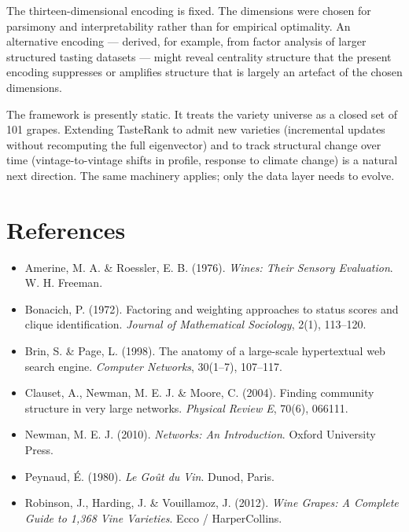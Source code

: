 \documentclass[11pt]{article}
\begin{document}
The thirteen-dimensional encoding is fixed. The dimensions were chosen for parsimony and interpretability rather than for empirical optimality. An alternative encoding --- derived, for example, from factor analysis of larger structured tasting datasets --- might reveal centrality structure that the present encoding suppresses or amplifies structure that is largely an artefact of the chosen dimensions.

The framework is presently static. It treats the variety universe as a closed set of 101 grapes. Extending TasteRank to admit new varieties (incremental updates without recomputing the full eigenvector) and to track structural change over time (vintage-to-vintage shifts in profile, response to climate change) is a natural next direction. The same machinery applies; only the data layer needs to evolve.

\section*{References}

\begin{itemize}[leftmargin=2em,itemsep=0.2em]
\item Amerine, M. A. \& Roessler, E. B. (1976). \emph{Wines: Their Sensory Evaluation}. W. H. Freeman.
\item Bonacich, P. (1972). Factoring and weighting approaches to status scores and clique identification. \emph{Journal of Mathematical Sociology}, 2(1), 113--120.
\item Brin, S. \& Page, L. (1998). The anatomy of a large-scale hypertextual web search engine. \emph{Computer Networks}, 30(1--7), 107--117.
\item Clauset, A., Newman, M. E. J. \& Moore, C. (2004). Finding community structure in very large networks. \emph{Physical Review E}, 70(6), 066111.
\item Newman, M. E. J. (2010). \emph{Networks: An Introduction}. Oxford University Press.
\item Peynaud, \'E. (1980). \emph{Le Go\^ut du Vin}. Dunod, Paris.
\item Robinson, J., Harding, J. \& Vouillamoz, J. (2012). \emph{Wine Grapes: A Complete Guide to 1{,}368 Vine Varieties}. Ecco / HarperCollins.
\end{itemize}
\end{document}
